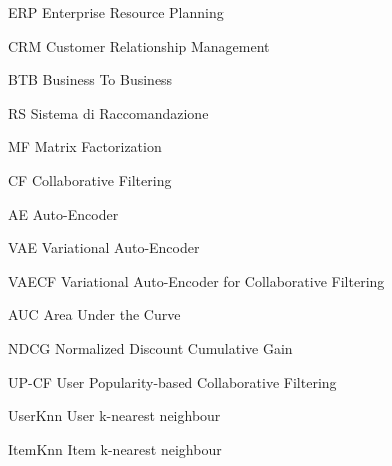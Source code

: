 
\begin{abbreviations}

\item[ERP] Enterprise Resource Planning
\item[CRM] Customer Relationship Management 
\item[BTB] Business To Business
\item[RS] Sistema di Raccomandazione
\item[MF] Matrix Factorization
\item[CF] Collaborative Filtering
\item[AE] Auto-Encoder
\item[VAE] Variational Auto-Encoder
\item[VAECF] Variational Auto-Encoder for Collaborative Filtering     
\item[AUC] Area Under the Curve
\item[NDCG] Normalized Discount Cumulative Gain
\item[UP-CF] User Popularity-based Collaborative Filtering
\item[UserKnn] User k-nearest neighbour
\item[ItemKnn] Item k-nearest neighbour
\end{abbreviations}